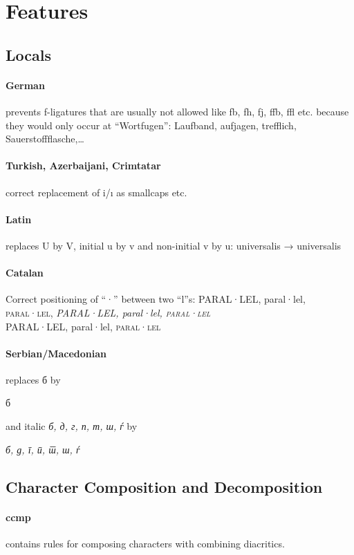 \documentclass[pagesize,DIV14]{scrartcl}
\begin{document}
\section{Features}
\subsection{Locals}
\paragraph*{German} prevents f-ligatures that are usually not allowed like fb, fh, fj, ffb, ffl etc. because they would only occur at \enquote{Wortfugen}: {Laufband, aufjagen, trefflich,  Sauerstoffflasche,…}
\paragraph*{Turkish, Azerbaijani, Crimtatar} correct replacement of i/ı as smallcaps etc.
\paragraph*{Latin} replaces U by V, initial u by v and non-initial v by u: universalis → { universalis}
\paragraph*{Catalan} Correct positioning of “·” between two “l”s: {PARAL·LEL, paral·lel, \textsc{paral·lel}, \textit{PARAL·LEL, paral·lel, \textsc{paral·lel}}\\{\scriptsize PARAL·LEL, paral·lel, \textsc{paral·lel}}}
\paragraph*{Serbian/Macedonian} replaces б by \begin{serbian}б\end{serbian} and italic \textit{б, д, г, п, т, ш, ѓ} by \begin{serbian}\itshape б, д, г, п, т, ш, ѓ\end{serbian}

\subsection{Character Composition and Decomposition}
\paragraph*{ccmp} contains rules for composing characters with combining diacritics.
\end{document}
